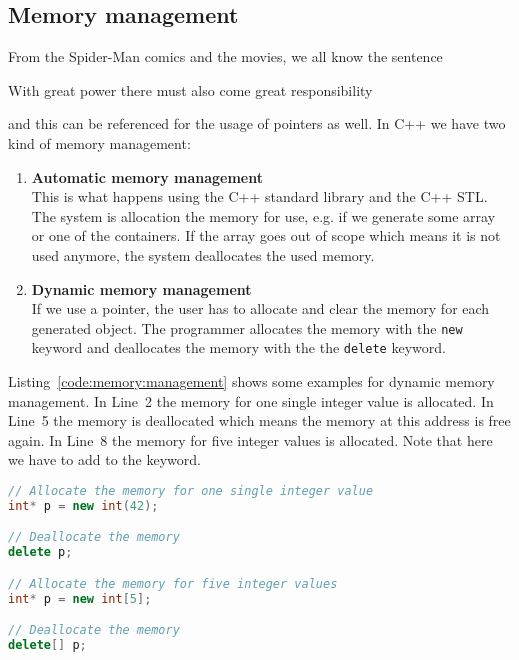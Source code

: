 \subsection{Memory management}
\label{sec:memory:management}
From the Spider-Man comics and the movies, we all know the sentence
\begin{center}
With great power there must also come great responsibility
\end{center}
and this can be referenced for the usage of pointers as well. In C++ we have two kind of memory management:
\vspace{0.25cm}
\begin{enumerate}
\item \textbf{Automatic memory management}\\
This is what happens using the C++ standard library and the C++ STL. The system is allocation the memory for use, e.g. if we generate some array  or one of the containers. If the array goes out of scope which means it is not used anymore, the system deallocates the used memory.
\item \textbf{Dynamic memory management}\\
If we use a pointer, the user has to allocate and clear the memory for each generated object. The programmer allocates the memory with the \lstinline|new| keyword
and deallocates the memory with the the \lstinline|delete| keyword.
\end{enumerate}
\vspace{0.25cm}
Listing~\ref{code:memory:management} shows some examples for dynamic memory management. In Line~2 the memory for one single integer value is allocated. In Line~5 the memory is deallocated which means the memory at this address is free again. In Line~8 the memory for five integer values is allocated. Note that here we have to add \cpp{[]} to the  keyword.

\begin{lstlisting}[language=c++,caption={Example for dynamic memory management.
\label{code:memory:management}},float,floatplacement=tb]
// Allocate the memory for one single integer value
int* p = new int(42);

// Deallocate the memory
delete p;

// Allocate the memory for five integer values
int* p = new int[5];

// Deallocate the memory
delete[] p;
\end{lstlisting}


